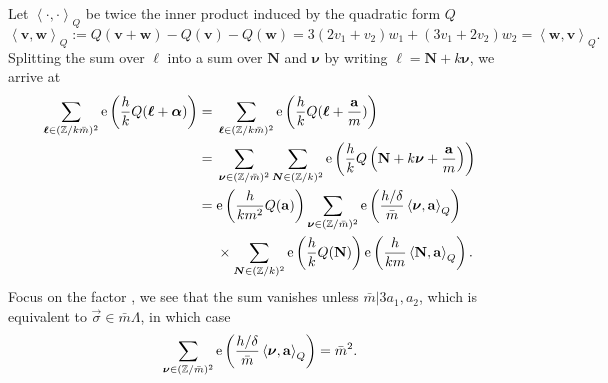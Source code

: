 \documentclass[pdftex]{sigma}
\newcommand{\ZZ}{\mathbb{Z}}
\def\bal{\boldsymbol{\alpha}}
\def\bol{\boldsymbol{\ell}}
\def\ex{{\rm e}}
\theoremstyle{definition}
\numberwithin{equation}{section}
\begin{document}
Let $\left< \cdot,\cdot \right>_{Q}$ be twice the inner product induced by the quadratic form $Q$
\begin{equation*}%
\left<\mathbf{v},\mathbf{w}\right>_Q:=Q(\mathbf{v}+\mathbf{w})-Q(\mathbf{v})-Q(\mathbf{w})=3\left(2v_1+v_2\right)w_1+\left(3v_1+2v_2\right)w_2=\left<\mathbf{w},\mathbf{v}\right>_Q.
\end{equation*}
Splitting the sum over $\bol$ into a sum over $\mathbf{N}$ and $\boldsymbol{\nu}$ by writing $\bol=\mathbf{N}+k\boldsymbol{\nu}$, we arrive at
\begin{align*}
\sum_{\boldsymbol{\ell}\in (\ZZ/k\bar m)^2 }\ex\left(\frac{h}{k}Q(\bol+\bal)\right) ={}& \sum_{\boldsymbol{\ell}\in (\ZZ/k\bar m)^2 }\ex\left(\frac{h}{k}Q(\bol+\frac{\mathbf{a}}{ m})\right)\\
={}& \sum_{\boldsymbol{\nu}\in (\ZZ/\bar m)^2 } \sum_{\boldsymbol{N}\in (\ZZ/k)^2 }\ex\left(\frac{h}{k}Q\left(\mathbf{N}+k\boldsymbol{\nu}+\frac{\mathbf{a}}{m}\right)\right)\\
={}& \ex\left( \frac{h}{k m^2} Q(\mathbf{a}) \right) \sum_{\boldsymbol{\nu}\in (\ZZ/\bar m)^2 } \ex\left(\frac{h/\delta}{\bar m}\left<\boldsymbol{\nu},\mathbf{a}\right>_Q \right) \\&\times \sum_{\boldsymbol{N}\in (\ZZ/k)^2 } \ex\left(\frac{h}{k}Q(\mathbf{N})\right) \ex\left(\frac{h}{km}\left<\mathbf{N},\mathbf{a}\right>_Q\right) .
\end{align*}
Focus on the factor \smash{$\sum_{\boldsymbol{\nu}\in (\ZZ/\bar m)^2 } \ex\left(\frac{h/\delta}{\bar m}\left<\boldsymbol{\nu},\mathbf{a}\right>_Q \right) $}, we see that the sum vanishes unless $\bar m\lvert 3a_1, a_2$, which is equivalent to $\vec \sigma \in \bar m \Lambda$, in which case
\begin{equation*}
 \sum_{\boldsymbol{\nu}\in (\ZZ/\bar m)^2 } \ex\left(\frac{h/\delta}{\bar m}\left<\boldsymbol{\nu},\mathbf{a}\right>_Q \right)=\bar m^2.
\end{equation*}
\end{document}
